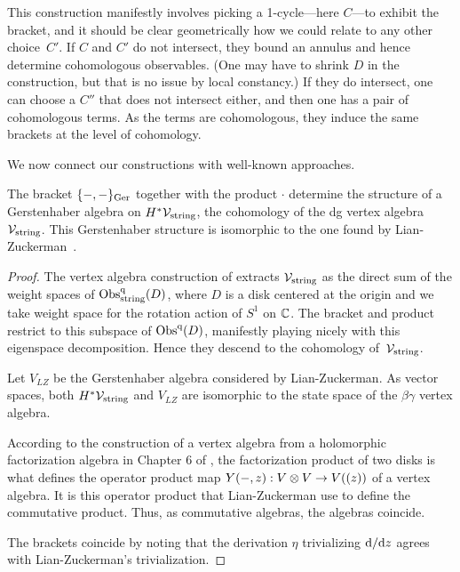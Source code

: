 \begin{rmk}
This construction manifestly involves picking a 1-cycle---here $C$---to exhibit the bracket, 
and it should be clear geometrically how we could relate to any other choice~$C'$.
If $C$ and $C'$ do not intersect, they bound an annulus and hence determine cohomologous observables.
(One may have to shrink $D$ in the construction, but that is no issue by local constancy.)
If they do intersect, one can choose a $C''$ that does not intersect either, and then one has a pair of cohomologous terms.
As the terms are cohomologous, they induce the same brackets at the level of cohomology.
\end{rmk}

We now connect our constructions with well-known approaches.

\begin{prop} 
The bracket $\{-,-\}_{\rm Ger}$ together with the product $\cdot$ determine the structure of a Gerstenhaber algebra on $H^* \mathcal{V}_{\rm string}$, 
the cohomology of the dg vertex algebra $\mathcal{V}_{\rm string}$. 
This Gerstenhaber structure is isomorphic to the one found by Lian-Zuckerman~\cite{LZ1}.
\end{prop}

\begin{proof}
The vertex algebra construction of \cite{CG1} extracts $\mathcal{V}_{\rm string}$ as the direct sum of the weight spaces of ${\rm Obs}^{\rm q}_{\rm string}(D)$, 
where $D$ is a disk centered at the origin and we take weight space for the rotation action of $S^1$ on $\mathbb C$.
The bracket and product restrict to this subspace of ${\rm Obs}^{\rm q}(D)$,
manifestly playing nicely with this eigenspace decomposition. 
Hence they descend to the cohomology of~$\mathcal{V}_{\rm string}$.

Let $V_{LZ}$ be the Gerstenhaber algebra considered by Lian-Zuckerman.
As vector spaces, both $H^* \mathcal{V}_{\rm string}$ and $V_{LZ}$ are isomorphic to the state space of the $\beta\gamma$ vertex algebra.

According to the construction of a vertex algebra from a holomorphic factorization algebra in Chapter 6 of \cite{CG1}, the factorization product of two disks is what defines the operator product map $Y(-,z) : V \otimes V \to V ((z))$ of a vertex algebra.
It is this operator product that Lian-Zuckerman use to define the commutative product.
Thus, as commutative algebras, the algebras coincide. 

The brackets coincide by noting that the derivation $\eta$ trivializing ${\rm d} / {\rm d} z$ agrees with Lian-Zuckerman's trivialization.
\end{proof}

